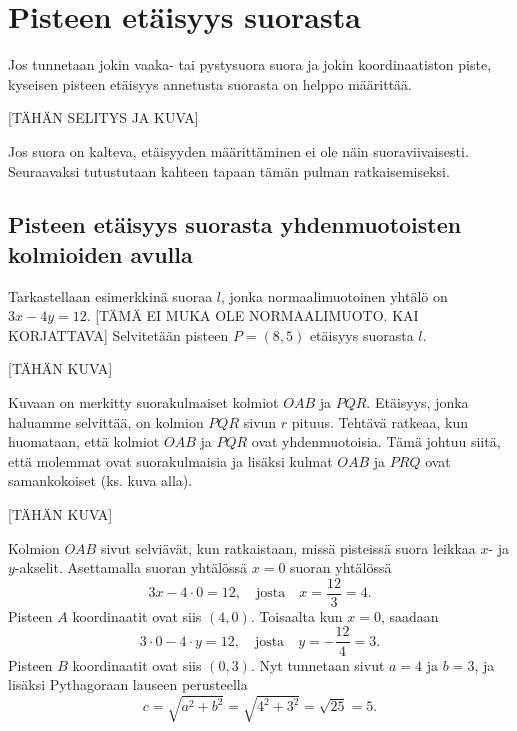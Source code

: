 \section{Pisteen etäisyys suorasta}


Jos tunnetaan jokin vaaka- tai pystysuora suora ja jokin koordinaatiston piste, kyseisen pisteen etäisyys annetusta suorasta on helppo määrittää.

[TÄHÄN SELITYS JA KUVA]

Jos suora on kalteva, etäisyyden määrittäminen ei ole näin suoraviivaisesti.
Seuraavaksi tutustutaan kahteen tapaan tämän pulman ratkaisemiseksi.

\subsection*{Pisteen etäisyys suorasta yhdenmuotoisten kolmioiden avulla}

Tarkastellaan esimerkkinä suoraa $l$, jonka normaalimuotoinen yhtälö on $3x-4y=12$. [TÄMÄ EI MUKA OLE NORMAALIMUOTO. KAI KORJATTAVA]
Selvitetään pisteen $P=(8,5)$ etäisyys suorasta $l$.

[TÄHÄN KUVA]

Kuvaan on merkitty suorakulmaiset kolmiot $OAB$ ja $PQR$.
Etäisyys, jonka haluamme selvittää, on kolmion $PQR$ sivun $r$ pituus.
Tehtävä ratkeaa, kun huomataan, että kolmiot $OAB$ ja $PQR$ ovat yhdenmuotoisia.
Tämä johtuu siitä, että molemmat ovat suorakulmaisia ja lisäksi kulmat $OAB$ ja $PRQ$ ovat samankokoiset (ks. kuva alla).

[TÄHÄN KUVA]

Kolmion $OAB$ sivut selviävät, kun ratkaistaan, missä pisteissä suora leikkaa $x$- ja $y$-akselit.
Asettamalla suoran yhtälössä $x=0$ suoran yhtälössä
\[
3x-4\cdot 0=12, \quad \text{josta} \quad x=\frac{12}{3}=4.
\]
Pisteen $A$ koordinaatit ovat siis $(4,0)$. Toisaalta kun $x=0$, saadaan
\[
3\cdot 0-4\cdot y=12, \quad \text{josta} \quad y=-\frac{12}{4}=3.
\]
Pisteen $B$ koordinaatit ovat siis $(0,3)$. Nyt tunnetaan sivut $a=4$ ja $b=3$, ja lisäksi Pythagoraan lauseen perusteella
\[
c=\sqrt{a^2+b^2}=\sqrt{4^2+3^2}=\sqrt{25}=5.
\]

